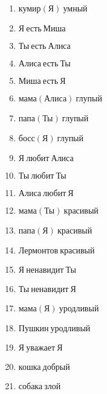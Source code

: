 \documentclass{article}
\begin{document}
\begin{enumerate}
\item $\text{кумир}(\text{Я}) \ \text{умный}$

\item $\text{Я} \ \text{есть} \ \text{Миша}$

\item $\text{Ты} \ \text{есть} \ \text{Алиса}$

\item $\text{Алиса} \ \text{есть} \ \text{Ты}$

\item $\text{Миша} \ \text{есть} \ \text{Я}$

\item $\text{мама}(\text{Алиса}) \ \text{глупый}$

\item $\text{папа}(\text{Ты}) \ \text{глупый}$

\item $\text{босс}(\text{Я}) \ \text{глупый}$

\item $\text{Я} \ \text{любит} \ \text{Алиса}$

\item $\text{Ты} \ \text{любит} \ \text{Ты}$

\item $\text{Алиса} \ \text{любит} \ \text{Я}$

\item $\text{мама}(\text{Ты}) \ \text{красивый}$

\item $\text{папа}(\text{Я}) \ \text{красивый}$

\item $\text{Лермонтов} \ \text{красивый}$

\item $\text{Я} \ \text{ненавидит} \ \text{Ты}$

\item $\text{Ты} \ \text{ненавидит} \ \text{Я}$

\item $\text{мама}(\text{Я}) \ \text{уродливый}$

\item $\text{Пушкин} \ \text{уродливый}$

\item $\text{Я} \ \text{уважает} \ \text{Я}$

\item $\text{кошка} \ \text{добрый}$

\item $\text{собака} \ \text{злой}$


\end{enumerate}
\end{document}
